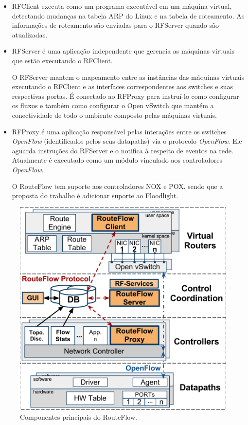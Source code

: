 \begin{itemize} 
\item RFClient executa como um programa
executável em um máquina virtual, detectando
mudanças na tabela ARP do Linux e na tabela de roteamento.
As informações de roteamento são enviadas para o
RFServer quando são atualizadas.
\item RFServer é uma aplicação independente que gerencia as
máquinas virtuais que estão executando o RFClient. 

O RFServer mantem o mapeamento entre as instâncias das
máquinas virtuais executando o RFClient e as interfaces
correspondentes aos switches e suas respectivas portas. É
conectado ao RFProxy para instruí-lo como configurar os
fluxos e também como configurar o Open vSwitch que mantém a
conectividade de todo o ambiente composto pelas máquinas virtuais.
\item RFProxy é uma aplicação responsável pelas interações
entre os switches \textit{OpenFlow} (identificados pelos seus
datapaths) via o protocolo \textit{OpenFlow}. Ele aguarda instruções
do RFServer e o notifica à respeito de eventos na rede.
Atualmente é executado como um módulo vinculado aos
controladores \textit{OpenFlow}. 

O RouteFlow tem suporte aos
controladores NOX e POX, sendo que a proposta do trabalho é
adicionar suporte ao Floodlight. 
\end{itemize}

\begin{figure}[h] 
\centering
\includegraphics[width=150mm]{componentesRouteFlow.png}
\caption{Componentes principais do RouteFlow.}
\label{fig:componentesRouteFlow} 
\end{figure}

